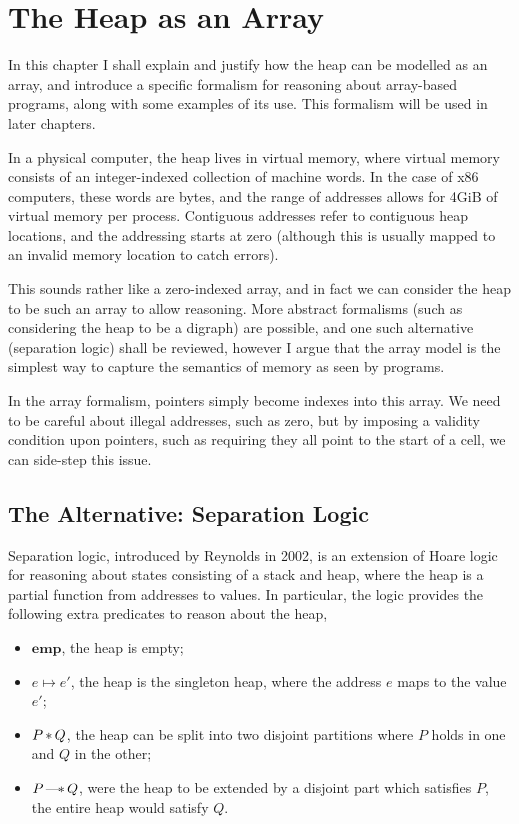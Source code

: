 \chapter{The Heap as an Array}
\label{sec:heap}

In this chapter I shall explain and justify how the heap can be
modelled as an array, and introduce a specific formalism for reasoning
about array-based programs, along with some examples of its use. This
formalism will be used in later chapters.

In a physical computer, the heap lives in virtual memory, where
virtual memory consists of an integer-indexed collection of machine
words. In the case of x86 computers, these words are bytes, and the
range of addresses allows for 4GiB of virtual memory per
process. Contiguous addresses refer to contiguous heap locations, and
the addressing starts at zero (although this is usually mapped to an
invalid memory location to catch errors).

This sounds rather like a zero-indexed array, and in fact we can
consider the heap to be such an array to allow reasoning. More
abstract formalisms (such as considering the heap to be a digraph) are
possible, and one such alternative (separation logic) shall be
reviewed, however I argue that the array model is the simplest way to
capture the semantics of memory as seen by programs.

In the array formalism, pointers simply become indexes into this
array. We need to be careful about illegal addresses, such as zero,
but by imposing a validity condition upon pointers, such as requiring
they all point to the start of a cell, we can side-step this issue.

\section{The Alternative: Separation Logic}
\label{sec:heap-separation}

Separation logic, introduced by Reynolds in 2002\cite{Reynolds02}, is
an extension of Hoare logic for reasoning about states consisting of a
stack and heap, where the heap is a partial function from addresses to
values. In particular, the logic provides the following extra
predicates to reason about the heap,

\begin{itemize}
  \item $\mathbf{emp}$, the heap is empty;

  \item $e \mapsto e'$, the heap is the singleton heap, where the
    address $e$ maps to the value $e'$;

  \item $P \operatorname{\ast} Q$, the heap can be split into two disjoint partitions
    where $P$ holds in one and $Q$ in the other;

  \item $P \operatorname{---\!\ast} Q$, were the heap to be extended by a disjoint part
    which satisfies $P$, the entire heap would satisfy $Q$.
\end{itemize}

